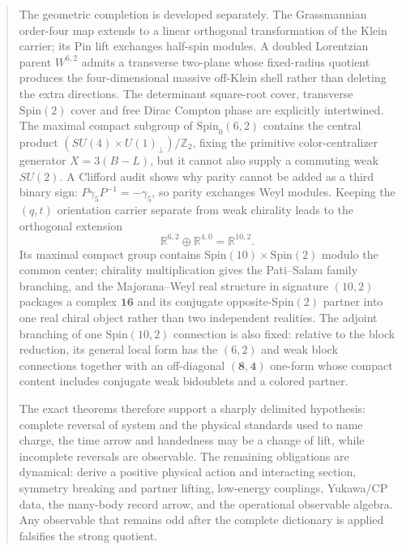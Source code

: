 \documentclass[11pt]{article}
\theoremstyle{definition}\newtheorem{definition}[theorem]{Definition}
\theoremstyle{remark}\newtheorem{remark}[theorem]{Remark}\newtheorem{conjecture}[theorem]{Conjecture}
\begin{document}
\begin{abstract}
The geometric completion is developed separately. The Grassmannian order-four map extends to a linear orthogonal transformation of the Klein carrier; its Pin lift exchanges half-spin modules. A doubled Lorentzian parent $W^{6,2}$ admits a transverse two-plane whose fixed-radius quotient produces the four-dimensional massive off-Klein shell rather than deleting the extra directions. The determinant square-root cover, transverse $\mathrm{Spin}(2)$ cover and free Dirac Compton phase are explicitly intertwined. The maximal compact subgroup of $\mathrm{Spin}_0(6,2)$ contains the central product $(SU(4)\times U(1)_\perp)/\mathbb Z_2$, fixing the primitive color-centralizer generator $X=3(B-L)$, but it cannot also supply a commuting weak $SU(2)$. A Clifford audit shows why parity cannot be added as a third binary sign: $P\gamma_5P^{-1}=-\gamma_5$, so parity exchanges Weyl modules. Keeping the $(q,t)$ orientation carrier separate from weak chirality leads to the orthogonal extension
\begin{equation*}
 \mathbb R^{6,2}\oplus\mathbb R^{4,0}=\mathbb R^{10,2}.
\end{equation*}
Its maximal compact group contains $\mathrm{Spin}(10)\times\mathrm{Spin}(2)$ modulo the common center; chirality multiplication gives the Pati--Salam family branching, and the Majorana--Weyl real structure in signature $(10,2)$ packages a complex $\mathbf{16}$ and its conjugate opposite-$\mathrm{Spin}(2)$ partner into one real chiral object rather than two independent realities.
The adjoint branching of one $\mathrm{Spin}(10,2)$ connection is also fixed: relative to the block reduction, its general local form has the $(6,2)$ and weak block connections together with an off-diagonal $(\mathbf8,\mathbf4)$ one-form whose compact content includes conjugate weak bidoublets and a colored partner.

The exact theorems therefore support a sharply delimited hypothesis: complete reversal of system and the physical standards used to name charge, the time arrow and handedness may be a change of lift, while incomplete reversals are observable. The remaining obligations are dynamical: derive a positive physical action and interacting section, symmetry breaking and partner lifting, low-energy couplings, Yukawa/CP data, the many-body record arrow, and the operational observable algebra. Any observable that remains odd after the complete dictionary is applied falsifies the strong quotient.
\end{abstract}
\end{document}
